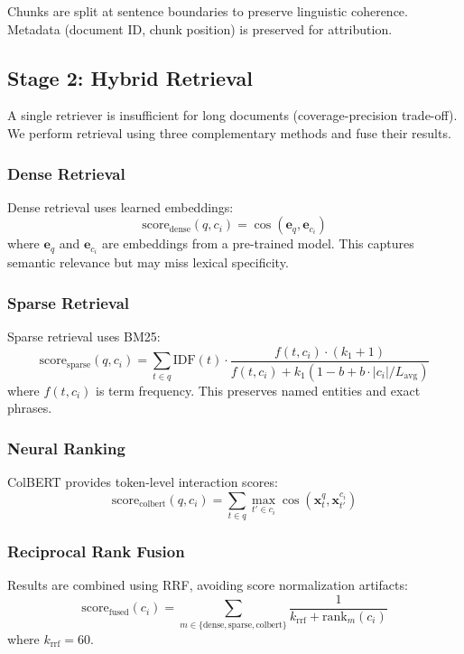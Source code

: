 \documentclass[11pt,a4paper]{article}
\begin{document}
Chunks are split at sentence boundaries to preserve linguistic coherence. Metadata (document ID, chunk position) is preserved for attribution.

\subsection{Stage 2: Hybrid Retrieval}

A single retriever is insufficient for long documents (coverage-precision trade-off). We perform retrieval using three complementary methods and fuse their results.

\subsubsection{Dense Retrieval}
Dense retrieval uses learned embeddings:
\begin{equation}
\text{score}_{\text{dense}}(q, c_i) = \cos(\mathbf{e}_q, \mathbf{e}_{c_i})
\end{equation}
where $\mathbf{e}_q$ and $\mathbf{e}_{c_i}$ are embeddings from a pre-trained model. This captures semantic relevance but may miss lexical specificity.

\subsubsection{Sparse Retrieval}
Sparse retrieval uses BM25:
\begin{equation}
\text{score}_{\text{sparse}}(q, c_i) = \sum_{t \in q} \text{IDF}(t) \cdot \frac{f(t, c_i) \cdot (k_1 + 1)}{f(t, c_i) + k_1 (1 - b + b \cdot |c_i| / L_{\text{avg}})}
\end{equation}
where $f(t, c_i)$ is term frequency. This preserves named entities and exact phrases.

\subsubsection{Neural Ranking}
ColBERT provides token-level interaction scores:
\begin{equation}
\text{score}_{\text{colbert}}(q, c_i) = \sum_{t \in q} \max_{t' \in c_i} \cos(\mathbf{x}_t^q, \mathbf{x}_{t'}^{c_i})
\end{equation}

\subsubsection{Reciprocal Rank Fusion}
Results are combined using RRF, avoiding score normalization artifacts:
\begin{equation}
\text{score}_{\text{fused}}(c_i) = \sum_{m \in \{\text{dense}, \text{sparse}, \text{colbert}\}} \frac{1}{k_{\text{rrf}} + \text{rank}_m(c_i)}
\end{equation}
where $k_{\text{rrf}} = 60$.
\end{document}
